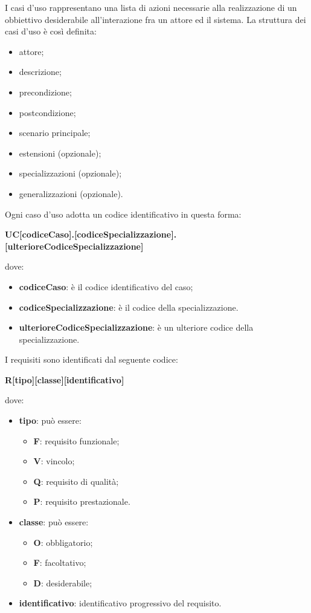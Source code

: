 		
		I casi d'uso rappresentano una lista di azioni necessarie alla realizzazione di un obbiettivo desiderabile all'interazione fra un attore ed il sistema.
		La struttura dei casi d'uso è così definita:
		\begin{itemize}
		    \item attore;
		    \item descrizione;
		    \item precondizione;
		    \item postcondizione;
		    \item scenario principale;
		    \item estensioni (opzionale);
		    \item specializzazioni (opzionale);
		    \item generalizzazioni (opzionale).
		\end{itemize}
		Ogni caso d'uso adotta un codice identificativo in questa forma:\\
	    \centerline{\textbf{UC[codiceCaso].[codiceSpecializzazione].[ulterioreCodiceSpecializzazione]}}
        dove:
	    \begin{itemize}
	        \item \textbf{codiceCaso}: è il codice identificativo del caso;
	        \item \textbf{codiceSpecializzazione}: è il codice della specializzazione.
	        \item \textbf{ulterioreCodiceSpecializzazione}: è un ulteriore codice della specializzazione.
	    \end{itemize}
	    I requisiti sono identificati dal seguente codice:\\
	    \centerline{\textbf{R[tipo][classe][identificativo]}}
	    dove:
	    \begin{itemize}
	        \item \textbf{tipo}: può essere:
	        \begin{itemize}
	            \item \textbf{F}: requisito funzionale;
	            \item \textbf{V}: vincolo;
	            \item \textbf{Q}: requisito di qualità;
	            \item \textbf{P}: requisito prestazionale. 
	        \end{itemize}
	        \item \textbf{classe}: può essere:
	        \begin{itemize}
	            \item \textbf{O}: obbligatorio;
	            \item \textbf{F}: facoltativo;
	            \item \textbf{D}: desiderabile;
	        \end{itemize}
	        \item \textbf{identificativo}: identificativo progressivo del requisito.
	    \end{itemize}
